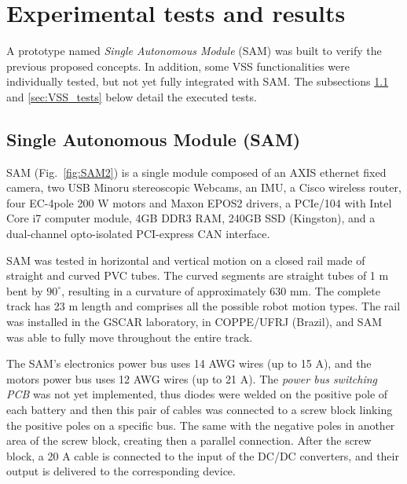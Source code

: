 \documentclass{ifacconf}
\begin{document}



\section{Experimental tests and results}\label{sec:results}
A prototype named \emph{Single Autonomous Module} (SAM) was built to verify the
previous proposed concepts. In addition, some VSS functionalities were
individually tested, but not yet fully integrated with SAM. The subsections
\ref{sec:SAM_tests} and \ref{sec:VSS_tests} below detail the executed tests.

\subsection{Single Autonomous Module (SAM)}\label{sec:SAM_tests}
SAM (Fig.~\ref{fig:SAM2}) is a single module composed of an AXIS ethernet fixed
camera, two USB Minoru stereoscopic Webcams, an IMU, a Cisco wireless router,
four EC-4pole 200 W motors and Maxon EPOS2 drivers, a PCIe/104 with Intel Core i7
computer module, 4GB DDR3 RAM, 240GB SSD (Kingston), and a dual-channel
opto-isolated PCI-express CAN interface.

SAM was tested in horizontal and vertical motion on a closed rail made of
straight and curved PVC tubes. The curved segments are straight tubes of 1 m
bent by $90^{\circ}$, resulting in a curvature of approximately 630 mm. The
complete track has 23 m length and comprises all the possible robot motion
types. The rail was installed in the GSCAR laboratory, in COPPE/UFRJ (Brazil),
and SAM was able to fully move throughout the entire track. 

The SAM's electronics power bus uses 14 AWG wires (up to 15 A), and the motors
power bus uses 12 AWG wires (up to 21 A). The \emph{power
bus switching PCB} was not yet implemented, thus diodes were welded on the
positive pole of each battery and then this pair of cables was connected to a
screw block linking the positive poles on a specific bus. The same with the
negative poles in another area of the screw block, creating then a parallel
connection. After the screw block, a 20 A cable is connected to the input of
the DC/DC converters, and their output is delivered to the corresponding device.
\end{document}
